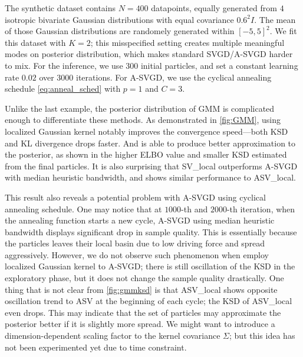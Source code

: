 The synthetic dataset contains $N = 400$ datapoints, equally generated from $4$ isotropic bivariate Gaussian distributions with equal covariance $0.6^2 I$. The mean of those Gaussian distributions are randomely generated within $[-5, 5]^2$. We fit this dataset with $K = 2$; this misspecified setting creates multiple meaningful modes on posterior distribution, which makes standard SVGD/A-SVGD harder to mix. 
For the inference, we use $300$ initial particles, and set a constant learning rate $0.02$ over $3000$ iterations. For A-SVGD, we use the cyclical annealing schedule \cref{eq:anneal_sched} with $p = 1$ and $C = 3$.

Unlike the last example, the posterior distribution of GMM is complicated enough to differentiate these methods. As demonstrated in \cref{fig:GMM}, using localized Gaussian kernel notably improves the convergence speed---both KSD and KL divergence drops faster. And is able to produce better approximation to the posterior, as shown in the higher ELBO value and smaller KSD estimated from the final particles. It is also surprising that SV\_local outperforms A-SVGD with median heuristic bandwidth, and shows similar performance to ASV\_local. 

This result also reveals a potential problem with A-SVGD using cyclical annealing schedule. One may notice that at $1000$-th and $2000$-th iteration, when the annealing function starts a new cycle, A-SVGD using median heuristic bandwidth displays significant drop in sample quality. This is essentially because the particles leaves their local basin due to low driving force and spread aggressively. However, we do not observe such phenomenon when employ localized Gaussian kernel to A-SVGD; there is still oscillation of the KSD in the exploratory phase, but it does not change the sample quality drastically. One thing that is not clear from \cref{fig:gmmksd} is that ASV\_local shows opposite oscillation trend to ASV at the beginning of each cycle; the KSD of ASV\_local even drops. This may indicate that the set of particles may approximate the posterior better if it is slightly more spread. We might want to introduce a dimension-dependent scaling factor to the kernel covariance $\Sigma$; but this idea has not been experimented yet due to time constraint. 


